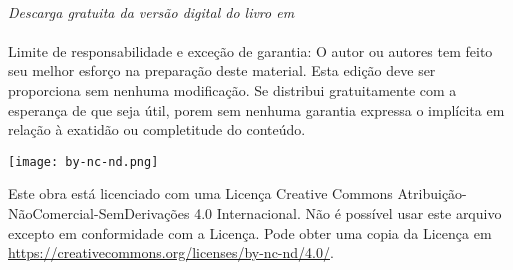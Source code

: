 ~\\

\noindent \textit{Descarga gratuita da versão digital do livro em \ImprimirLinkHomePageLivro}\\

~\\

\noindent Limite de responsabilidade e exceção de garantia: O autor ou autores tem feito
seu melhor esforço na preparação deste material.
Esta edição deve ser proporciona sem nenhuma modificação. 
Se distribui gratuitamente com a esperança de que seja útil, 
porem sem nenhuma garantia expressa o implícita em relação à exatidão ou completitude do conteúdo.


\vfill
\noindent \texttt{[image: by-nc-nd.png]}

\noindent Este obra está licenciado com uma Licença 
Creative Commons Atribuição-NãoComercial-SemDerivações 4.0 Internacional.
Não é possível usar este arquivo excepto em conformidade com a Licença. 
Pode obter uma copia da Licença em
\url{https://creativecommons.org/licenses/by-nc-nd/4.0/}.\\ %
